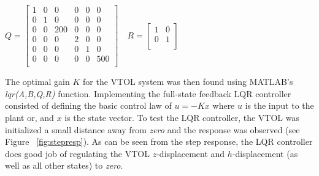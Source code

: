 \documentclass[dvips,12pt]{article}
\begin{document}
\begin{center}
$
 Q
 = 
   \begin{bmatrix}
        1 & 0 & 0 & 0 & 0 & 0  \\
        0 & 1 & 0 & 0 & 0 & 0 \\
        0 & 0 & 200 & 0 & 0 & 0 \\
        0 & 0 & 0 & 2 & 0 & 0 \\
        0 & 0 & 0 & 0 & 1 & 0 \\
        0 & 0 & 0 & 0 & 0 & 500 \\
      \end{bmatrix}
      \quad
      R
       = 
         \begin{bmatrix}
              1 & 0  \\
              0 & 1  \\
            \end{bmatrix}         
$
\end{center}
The optimal gain $K$ for the VTOL system was then found using MATLAB's \textit{lqr(A,B,Q,R)} function.  Implementing the full-state feedback LQR controller consisted of defining the basic control law of $u = -Kx$ where $u$ is the input to the plant or, and $x$ is the state vector.  To test the LQR controller, the VTOL was initialized a small distance away from \textit{zero} and the response was observed (see Figure ~\ref{fig:stepresp}).  As can be seen from the step response, the LQR controller does good job of regulating the VTOL $z$-displacement and $h$-displacement (as well as all other states) to \textit{zero}. 
\end{document}
